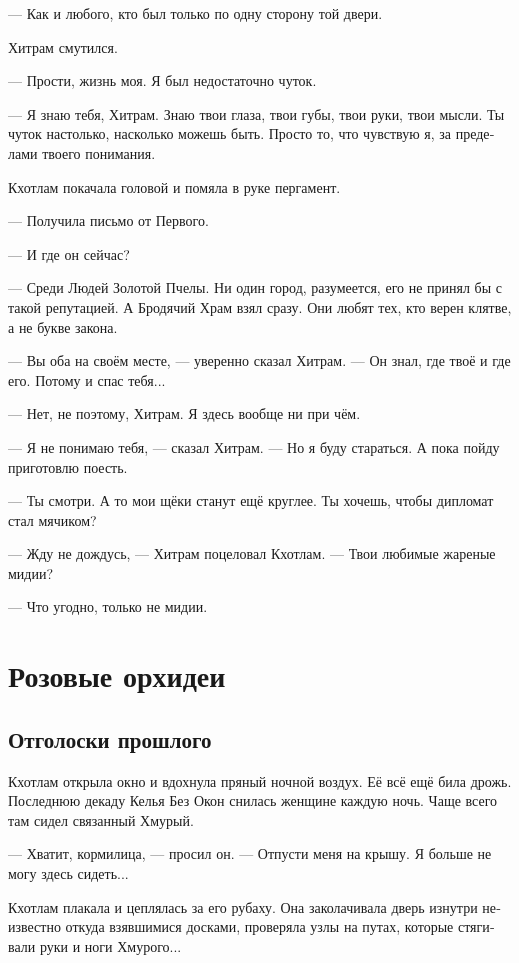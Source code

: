 \documentclass[a4paper,12pt,fleqn]{book}\usepackage{polyglossia}\setdefaultlanguage[babelshorthands=true]{russian}\setotherlanguage{english}\defaultfontfeatures{Ligatures=TeX,Mapping=tex-text}\usepackage{xcolor}\newcommand{\ml}[3]{#2}
\begin{document}
--- Как и любого, кто был только по одну сторону той двери.

Хитрам смутился.

--- Прости, жизнь моя.
Я был недостаточно чуток.

--- Я знаю тебя, Хитрам.
Знаю твои глаза, твои губы, твои руки, твои мысли.
Ты чуток настолько, насколько можешь быть.
Просто то, что чувствую я, за пределами твоего понимания.

Кхотлам покачала головой и помяла в руке пергамент.

--- Получила письмо от Первого.

--- И где он сейчас?

--- Среди Людей Золотой Пчелы.
Ни один город, разумеется, его не принял бы с такой репутацией.
А Бродячий Храм взял сразу.
Они любят тех, кто верен клятве, а не букве закона.

--- Вы оба на своём месте, --- уверенно сказал Хитрам.
--- Он знал, где твоё и где его.
Потому и спас тебя...

--- Нет, не поэтому, Хитрам.
Я здесь вообще ни при чём.

--- Я не понимаю тебя, --- сказал Хитрам.
--- Но я буду стараться.
А пока пойду приготовлю поесть.

--- Ты смотри.
А то мои щёки станут ещё круглее.
Ты хочешь, чтобы дипломат стал мячиком?

--- Жду не дождусь, --- Хитрам поцеловал Кхотлам.
--- Твои любимые жареные мидии?

--- Что угодно, только не мидии.

\chapter{Розовые орхидеи}

\section{Отголоски прошлого}

Кхотлам открыла окно и вдохнула пряный ночной воздух.
Её всё ещё била дрожь.
Последнюю декаду Келья Без Окон снилась женщине каждую ночь.
Чаще всего там сидел связанный Хмурый.

--- Хватит, кормилица, --- просил он.
--- Отпусти меня на крышу.
Я больше не могу здесь сидеть...

Кхотлам плакала и цеплялась за его рубаху.
Она заколачивала дверь изнутри неизвестно откуда взявшимися досками, проверяла узлы на путах, которые стягивали руки и ноги Хмурого...
\end{document}
